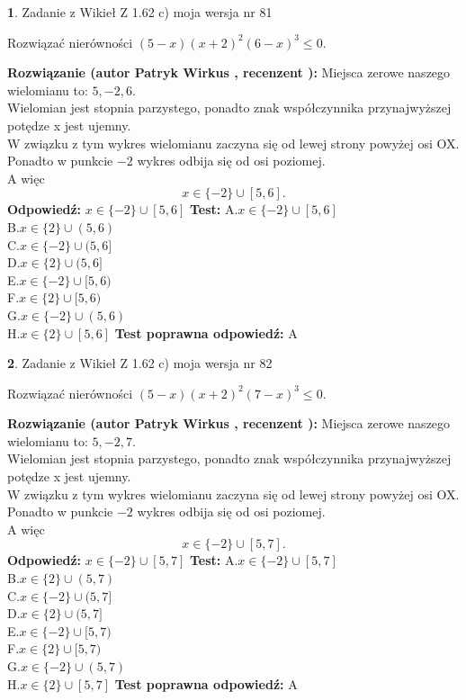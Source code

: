 \documentclass[12pt, a4paper]{article}
\theoremstyle{definition} %
\newtheorem{zad}{}
\newcommand{\zadStart}[1]{\begin{zad}#1\newline}
\newcommand{\zadStop}{\end{zad}}
\newcommand{\rozwStart}[2]{\noindent \textbf{Rozwiązanie (autor #1 , recenzent #2): }\newline}
\newcommand{\rozwStop}{\newline}
\newcommand{\odpStart}{\noindent \textbf{Odpowiedź:}\newline}
\newcommand{\odpStop}{\newline}
\newcommand{\testStart}{\noindent \textbf{Test:}\newline}
\newcommand{\testStop}{\newline}
\newcommand{\kluczStart}{\noindent \textbf{Test poprawna odpowiedź:}\newline}
\newcommand{\kluczStop}{\newline}
\begin{document}
\zadStart{Zadanie z Wikieł Z 1.62 c) moja wersja nr 81}

Rozwiązać nierówności $(5-x)(x+2)^{2}(6-x)^{3}\le0$.
\zadStop
\rozwStart{Patryk Wirkus}{}
Miejsca zerowe naszego wielomianu to: $5, -2, 6$.\\
Wielomian jest stopnia parzystego, ponadto znak współczynnika przy\linebreak najwyższej potędze x jest ujemny.\\ W związku z tym wykres wielomianu zaczyna się od lewej strony powyżej osi OX.\\
Ponadto w punkcie $-2$ wykres odbija się od osi poziomej.\\
A więc $$x \in \{-2\} \cup [5,6].$$
\rozwStop
\odpStart
$x \in \{-2\} \cup [5,6]$
\odpStop
\testStart
A.$x \in \{-2\} \cup [5,6]$\\
B.$x \in \{2\} \cup (5,6)$\\
C.$x \in \{-2\} \cup (5,6]$\\
D.$x \in \{2\} \cup (5,6]$\\
E.$x \in \{-2\} \cup [5,6)$\\
F.$x \in \{2\} \cup [5,6)$\\
G.$x \in \{-2\} \cup (5,6)$\\
H.$x \in \{2\} \cup [5,6]$
\testStop
\kluczStart
A
\kluczStop



\zadStart{Zadanie z Wikieł Z 1.62 c) moja wersja nr 82}

Rozwiązać nierówności $(5-x)(x+2)^{2}(7-x)^{3}\le0$.
\zadStop
\rozwStart{Patryk Wirkus}{}
Miejsca zerowe naszego wielomianu to: $5, -2, 7$.\\
Wielomian jest stopnia parzystego, ponadto znak współczynnika przy\linebreak najwyższej potędze x jest ujemny.\\ W związku z tym wykres wielomianu zaczyna się od lewej strony powyżej osi OX.\\
Ponadto w punkcie $-2$ wykres odbija się od osi poziomej.\\
A więc $$x \in \{-2\} \cup [5,7].$$
\rozwStop
\odpStart
$x \in \{-2\} \cup [5,7]$
\odpStop
\testStart
A.$x \in \{-2\} \cup [5,7]$\\
B.$x \in \{2\} \cup (5,7)$\\
C.$x \in \{-2\} \cup (5,7]$\\
D.$x \in \{2\} \cup (5,7]$\\
E.$x \in \{-2\} \cup [5,7)$\\
F.$x \in \{2\} \cup [5,7)$\\
G.$x \in \{-2\} \cup (5,7)$\\
H.$x \in \{2\} \cup [5,7]$
\testStop
\kluczStart
A
\kluczStop
\end{document}
